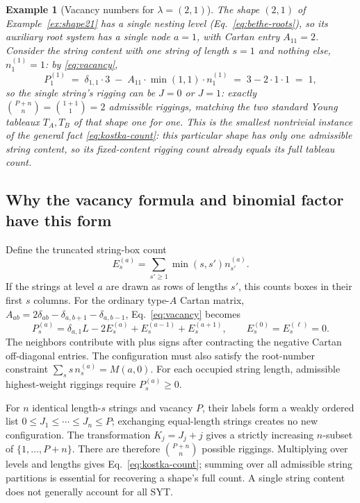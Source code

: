 \documentclass[11pt]{article}
\newtheorem{example}{Example}[section]
\begin{document}
\begin{example}[Vacancy numbers for $\lambda=(2,1)$]
\label{ex:vacancy21}
The shape $(2,1)$ of Example~\ref{ex:shape21} has a single nesting level
(Eq.~\eqref{eq:bethe-roots}), so its auxiliary root system has a single
node $a=1$, with Cartan entry $A_{11}=2$. Consider the string content with
one string of length $s=1$ and nothing else, $n^{(1)}_1=1$: by
\eqref{eq:vacancy},
\[
  P^{(1)}_1 \;=\; \delta_{1,1}\cdot 3 \;-\; A_{11}\cdot\min(1,1)\cdot n^{(1)}_1
  \;=\; 3 - 2\cdot1\cdot1 \;=\; 1,
\]
so the single string's rigging can be $J=0$ or $J=1$: exactly
$\binom{P+n}{n}=\binom{1+1}{1}=2$ admissible riggings, matching the two
standard Young tableaux $T_A,T_B$ of that shape one for one. This is the
smallest nontrivial instance of the general fact
\eqref{eq:kostka-count}: this particular shape has only one admissible string content, so its
fixed-content rigging count already equals its full tableau count.
\end{example}

\subsection{Why the vacancy formula and binomial factor have this form}

Define the truncated string-box count
\[
 E^{(a)}_s=\sum_{s'\ge1}\min(s,s')n^{(a)}_{s'}.
\]
If the strings at level $a$ are drawn as rows of lengths $s'$, this counts
boxes in their first $s$ columns. For the ordinary type-$A$ Cartan matrix,
$A_{ab}=2\delta_{ab}-\delta_{a,b+1}-\delta_{a,b-1}$,
Eq.~\eqref{eq:vacancy} becomes
\begin{equation}
 \label{eq:vacancy-local}
 P^{(a)}_s=\delta_{a,1}L-2E^{(a)}_s+E^{(a-1)}_s+E^{(a+1)}_s,
 \qquad E^{(0)}_s=E^{(\ell)}_s=0.
\end{equation}
The neighbors contribute with plus signs after contracting the negative
Cartan off-diagonal entries. The configuration must also satisfy the
root-number constraint $\sum_s s\,n^{(a)}_s=M(a,0)$.
For each occupied string length, admissible highest-weight riggings
require $P^{(a)}_s\ge0$.

For $n$ identical length-$s$ strings and vacancy $P$, their labels form a
weakly ordered list $0\le J_1\le\cdots\le J_n\le P$; exchanging equal-length
strings creates no new configuration. The transformation $K_j=J_j+j$
gives a strictly increasing $n$-subset of $\{1,\ldots,P+n\}$.
There are therefore $\binom{P+n}{n}$ possible riggings. Multiplying over
levels and lengths gives Eq.~\eqref{eq:kostka-count}; summing over all
admissible string partitions is essential for recovering a shape's full
count. A single string content does not generally account for all SYT.
\end{document}
